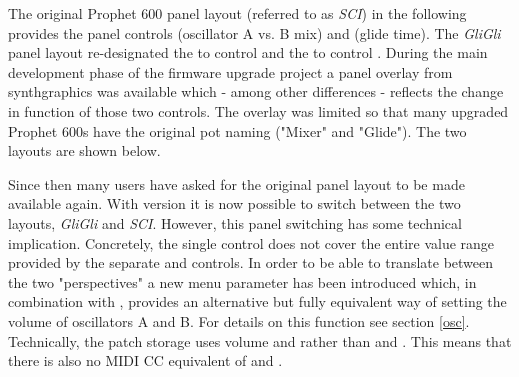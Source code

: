 The original Prophet 600 panel layout (referred to as \textit{SCI}) in the following provides the panel controls \mixer (oscillator A vs. B mix) and \glidepot (glide time). The \textit{GliGli} panel layout re-designated the \mixer to control \vola and the \glidepot to control \volb. During the main development phase of the firmware upgrade project a panel overlay from synthgraphics\cite{synthgraphics} was available which - among other differences - reflects the change in function of those two controls. The overlay was limited so that many upgraded Prophet 600s have the original pot naming ("Mixer" and "Glide"). The two layouts are shown below. 


Since then many users have asked for the original panel layout to be made available again. With version \version it is now possible to switch between the two layouts, \textit{GliGli} and \textit{SCI}. However, this panel switching has some technical implication. Concretely, the single \mixer control does not cover the entire value range provided by the separate \vola and \volb controls. In order to be able to translate between the two "perspectives" a new menu parameter \drive has been introduced which, in combination with \mixer, provides an alternative but fully equivalent way of setting the volume of oscillators A and B. For details on this function see section \ref{osc}. Technically, the patch storage uses volume \vola and \volb rather than \mixer and \drive. This means that there is also no MIDI CC equivalent of \mixer and \drive.

